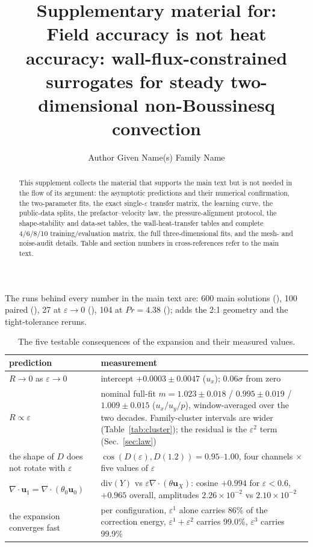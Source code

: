 \documentclass[preprint,11pt,a4paper,times]{elsarticle}
\begin{document}
\begin{frontmatter}
\title{Supplementary material for:\\
Field accuracy is not heat accuracy: wall-flux-constrained surrogates
for steady two-dimensional non-Boussinesq convection}
\author[a]{Author Given Name(s) Family Name}
\address[a]{Department, Institution, City, Country}
\begin{abstract}
This supplement collects the material that supports the main text but is not needed in the flow of
its argument: the asymptotic predictions and their numerical confirmation, the two-parameter fits,
the exact single-$\varepsilon$ transfer matrix, the learning curve, the public-data splits, the
prefactor--velocity law, the pressure-alignment protocol, the shape-stability and data-set tables,
the wall-heat-transfer tables and complete 4/6/8/10 training/evaluation matrix, the full
three-dimensional fits, and the mesh- and noise-audit details. Table and section numbers in
cross-references refer to the main text.
\end{abstract}
\end{frontmatter}

The runs behind every number in the main text are: 600 main solutions
(), 100 paired (), 27 at
$\varepsilon\to0$ (), 104 at $Pr=4.38$ ();
 adds the 2:1 geometry and the tight-tolerance reruns.

\begin{table}[htbp]
\centering
\small
\caption{The five testable consequences of the expansion and their measured values.}
\label{tab:predictions}
\begin{tabular}{@{}p{3.2cm}p{9.0cm}@{}}
\toprule
prediction & measurement\\
\midrule
$R\to0$ as $\varepsilon\to0$ & intercept $+0.0003\pm0.0047$ ($u_x$); $0.06\sigma$ from zero\\
$R\propto\varepsilon$ & nominal full-fit $m=1.023\pm0.018$ / $0.995\pm0.019$ /
$1.009\pm0.015$ ($u_x/u_y/p$), window-averaged over the two decades. Family-cluster intervals
are wider (Table~\ref{tab:cluster}); the residual is the $\varepsilon^2$ term
(Sec.~\ref{sec:law})\\
the shape of $D$ does not rotate with $\varepsilon$ & $\cos(D(\varepsilon),D(1.2))=0.95$--$1.00$,
four channels $\times$ five values of $\varepsilon$\\
$\nabla\cdot\bm u_1=\nabla\cdot(\theta_0\bm u_0)$ & $\mathrm{div}(Y)$ vs
$\varepsilon\nabla\cdot(\theta\bm u_X)$: cosine $+0.994$ for $\varepsilon<0.6$, $+0.965$ overall,
amplitudes $2.26\times10^{-2}$ vs $2.10\times10^{-2}$\\
the expansion converges fast & per configuration, $\varepsilon^1$ alone carries 86\% of the
correction energy, $\varepsilon^1+\varepsilon^2$ carries 99.0\%, $\varepsilon^3$ carries 99.9\%\\
\bottomrule
\end{tabular}
\end{table}
\end{document}
